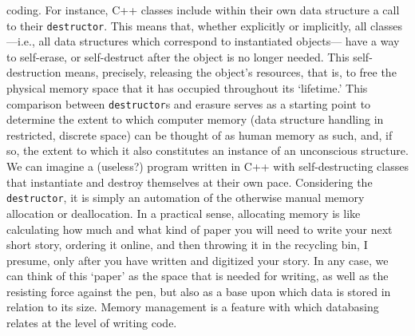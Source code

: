 coding. For instance, C++ classes include within their own data structure a call to their \texttt{destructor}. This means that, whether explicitly or implicitly, all classes ---i.e., all data structures which correspond to instantiated objects--- have a way to self-erase, or self-destruct after the object is no longer needed. This self-destruction means, precisely, releasing the object's resources, that is, to free the physical memory space that it has occupied throughout its `lifetime.' This comparison between \texttt{destructor}s and erasure serves as a starting point to determine the extent to which computer memory (data structure handling in restricted, discrete space) can be thought of as human memory as such, and, if so, the extent to which it also constitutes an instance of an unconscious structure. We can imagine a (useless?) program written in C++ with self-destructing classes that instantiate and destroy themselves at their own pace. Considering the \texttt{destructor}, it is simply an automation of the otherwise manual memory allocation or deallocation. In a practical sense, allocating memory is like calculating how much and what kind of paper you will need to write your next short story, ordering it online, and then throwing it in the recycling bin, I presume, only after you have written and digitized your story. In any case, we can think of this `paper' as the space that is needed for writing, as well as the resisting force against the pen, but also as a base upon which data is stored in relation to its size. Memory management is a feature with which databasing relates at the level of writing code.




